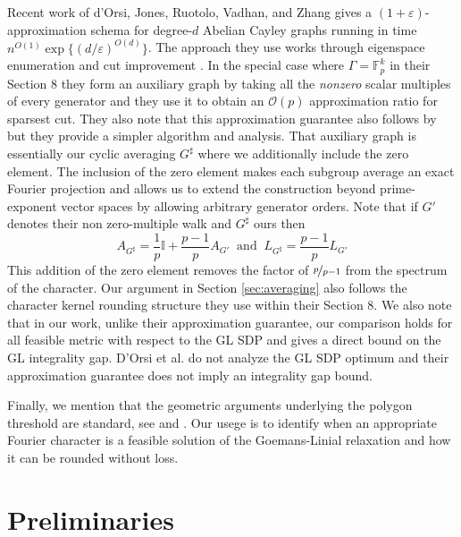 \documentclass[11pt]{article}
\theoremstyle{definition}
\theoremstyle{remark}
\newcommand{\eps}{\varepsilon}
\begin{document}
Recent work of d'Orsi, Jones, Ruotolo, Vadhan, and Zhang gives a $(1+\eps)$-approximation schema for degree-$d$ Abelian Cayley graphs running in time $n^{O(1)}\exp\{(d/\eps)^{O(d)}\}$. The approach they use works through eigenspace enumeration and cut improvement \cite{dorsiaetall25}. In the special case where $\Gamma=\mathbb{F}_p^k$ in their Section 8 they form an auxiliary graph by taking all the \emph{nonzero} scalar multiples of every generator and they use it to obtain an $\mathcal{O}(p)$ approximation ratio for sparsest cut. They also note that this approximation guarantee also follows by \cite{DBLP:conf/stoc/KwokLLGT13} but they provide a simpler algorithm and analysis. That auxiliary graph is essentially our cyclic averaging $G^\sharp$ where we additionally include the zero element. The inclusion of the zero element makes each subgroup average an exact Fourier projection and allows us to extend the construction beyond prime-exponent vector spaces by allowing arbitrary generator  orders. 
Note that if $G'$ denotes their non zero-multiple walk and $G^\sharp$ ours then
\[
A_{G^{\sharp}} = \frac{1}{p} \mathbb{I} + \frac{p-1}{p}A_{G'} ~\mbox{ and }~ L_{G^\sharp} = \frac{p-1}{p} L_{G'}
\]
This addition of the zero element removes the factor of $\nicefrac{p}{p-1}$  from the spectrum of the character. Our argument in Section \ref{sec:averaging} also follows the character kernel rounding structure they use within their Section 8.  We also note that in our work, unlike their approximation guarantee, our comparison holds for all feasible metric with respect to the GL SDP and gives a direct bound on the GL integrality gap. D’Orsi et al. do not analyze the GL SDP optimum and their approximation guarantee does not imply an integrality gap bound. 


Finally, we  mention that the geometric arguments underlying the polygon threshold are standard, see \cite{DG62} and \cite{DL97}. Our  usege  is to identify when an appropriate Fourier character is a feasible solution of the Goemans-Linial  relaxation and how it can be rounded without loss.




\section{Preliminaries}\label{sec:preliminaries}
\end{document}

